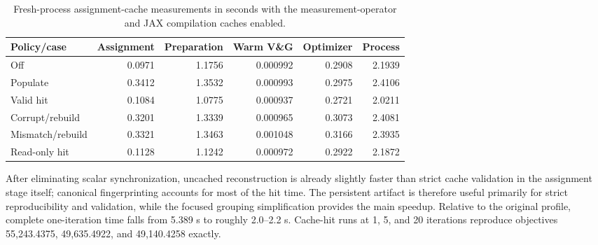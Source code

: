 \begin{table}[htbp]
\centering
\small
\begin{tabular}{lrrrrr}
\hline
Policy/case & Assignment & Preparation & Warm V\&G & Optimizer & Process \\
\hline
Off & 0.0971 & 1.1756 & 0.000992 & 0.2908 & 2.1939 \\
Populate & 0.3412 & 1.3532 & 0.000993 & 0.2975 & 2.4106 \\
Valid hit & 0.1084 & 1.0775 & 0.000937 & 0.2721 & 2.0211 \\
Corrupt/rebuild & 0.3201 & 1.3339 & 0.000965 & 0.3073 & 2.4081 \\
Mismatch/rebuild & 0.3321 & 1.3463 & 0.001048 & 0.3166 & 2.3935 \\
Read-only hit & 0.1128 & 1.1242 & 0.000972 & 0.2922 & 2.1872 \\
\hline
\end{tabular}
\caption{Fresh-process assignment-cache measurements in seconds with the
measurement-operator and JAX compilation caches enabled.}
\label{tab:case-specific-assignment-cache}
\end{table}

After eliminating scalar synchronization, uncached reconstruction is already
slightly faster than strict cache validation in the assignment stage itself;
canonical fingerprinting accounts for most of the hit time. The persistent
artifact is therefore useful primarily for strict reproducibility and validation,
while the focused grouping simplification provides the main speedup. Relative to
the original profile, complete one-iteration time falls from 5.389 s to roughly
2.0--2.2 s. Cache-hit runs at 1, 5, and 20 iterations reproduce objectives
55,243.4375, 49,635.4922, and 49,140.4258 exactly.

